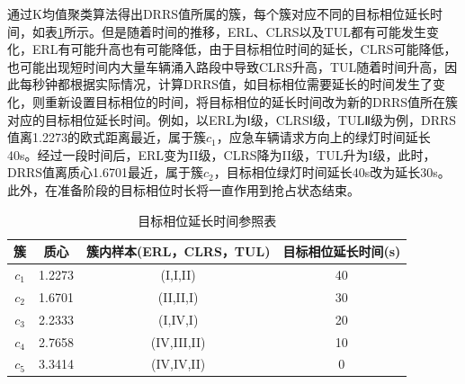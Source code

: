 通过K均值聚类算法得出DRRS值所属的簇，每个簇对应不同的目标相位延长时间，如表\ref{table:extendtime}所示。但是随着时间的推移，ERL、CLRS以及TUL都有可能发生变化，ERL有可能升高也有可能降低，由于目标相位时间的延长，CLRS可能降低，也可能出现短时间内大量车辆涌入路段中导致CLRS升高，TUL随着时间升高，因此每秒钟都根据实际情况，计算DRRS值，如目标相位需要延长的时间发生了变化，则重新设置目标相位的时间，将目标相位的延长时间改为新的DRRS值所在簇对应的目标相位延长时间。例如，以ERL为Ⅰ级，CLRSⅠ级，TULⅡ级为例，DRRS值离1.2273的欧式距离最近，属于簇${c_1}$，应急车辆请求方向上的绿灯时间延长40s。经过一段时间后，ERL变为II级，CLRS降为II级，TUL升为I级，此时，DRRS值离质心1.6701最近，属于簇${c_2}$，目标相位绿灯时间延长40s改为延长30s。此外，在准备阶段的目标相位时长将一直作用到抢占状态结束。

\begin{table}[H]
	\centering
	\caption{目标相位延长时间参照表}
	\label{table:extendtime}
	\begin{tabular}{|c|c|c|c|}
		\hline
		簇 & 质心 & 簇内样本(ERL，CLRS，TUL) &  目标相位延长时间(s) \\
		\hline
		${c_1}$ & 1.2273 & (I,I,II) & 40 \\ \hline
		${c_2}$ & 1.6701 & (II,II,I) & 30 \\ \hline
		${c_3}$ & 2.2333 & (I,IV,I) & 20 \\ \hline
		${c_4}$ & 2.7658 & (IV,III,II) & 10 \\ \hline
		${c_5}$ & 3.3414 & (IV,IV,II) & 0 \\ \hline
	\end{tabular}
\end{table}




